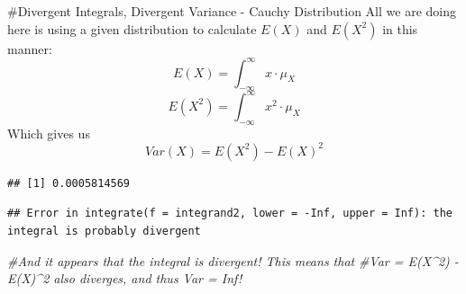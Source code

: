 \documentclass[]{article}
\newenvironment{Shaded}{\begin{snugshade}}{\end{snugshade}}
\newcommand{\CommentTok}[1]{\textcolor[rgb]{0.56,0.35,0.01}{\textit{#1}}}
\newcommand{\ControlFlowTok}[1]{\textcolor[rgb]{0.13,0.29,0.53}{\textbf{#1}}}
\newcommand{\DataTypeTok}[1]{\textcolor[rgb]{0.13,0.29,0.53}{#1}}
\newcommand{\DecValTok}[1]{\textcolor[rgb]{0.00,0.00,0.81}{#1}}
\newcommand{\KeywordTok}[1]{\textcolor[rgb]{0.13,0.29,0.53}{\textbf{#1}}}
\newcommand{\NormalTok}[1]{#1}
\newcommand{\OperatorTok}[1]{\textcolor[rgb]{0.81,0.36,0.00}{\textbf{#1}}}
\newcommand{\OtherTok}[1]{\textcolor[rgb]{0.56,0.35,0.01}{#1}}
\newcommand{\StringTok}[1]{\textcolor[rgb]{0.31,0.60,0.02}{#1}}
\begin{document}
\#Divergent Integrals, Divergent Variance - Cauchy Distribution All we
are doing here is using a given distribution to calculate \(E(X)\) and
\(E(X^2)\) in this manner:
\[E(X) = \int_{-\infty}^{\infty} x \cdot \mu_X \]
\[E(X^2) = \int_{-\infty}^{\infty} x^2 \cdot \mu_X \] Which gives us
\[Var(X) = E(X^2) - E(X)^2\]

\begin{Shaded}
\end{Shaded}

\begin{verbatim}
## [1] 0.0005814569
\end{verbatim}

\begin{Shaded}
\end{Shaded}

\begin{verbatim}
## Error in integrate(f = integrand2, lower = -Inf, upper = Inf): the integral is probably divergent
\end{verbatim}

\begin{Shaded}
\begin{Highlighting}[]
\CommentTok{#And it appears that the integral is divergent! This means that }
\CommentTok{#Var = E(X^2) - E(X)^2 also diverges, and thus Var = Inf!}
\end{Highlighting}
\end{Shaded}
\end{document}
